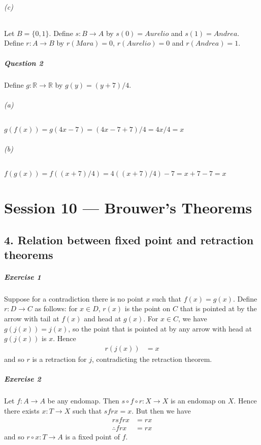 \documentclass{report}
\begin{document}
    \subparagraph{(c)}
    Let $B = \{ 0, 1 \}$. Define $s : B \rightarrow A$ by $s(0) = Aurelio$ and $s(1) = Andrea$.
    Define $r : A \rightarrow B$ by $r(Mara) = 0$, $r(Aurelio) = 0$ and $r(Andrea) = 1$.

    \paragraph{Question 2}
    Define $g : \mathbb{R} \rightarrow \mathbb{R}$ by $g(y) = (y+7)/4$.
    \subparagraph{(a)}
    $g(f(x)) = g(4x-7) = (4x-7+7)/4 = 4x/4 = x$
    \subparagraph{(b)}
    $f(g(x)) = f((x+7)/4) = 4((x+7)/4) - 7 = x+7-7 = x$

    \chapter{Session 10 --- Brouwer's Theorems}

    \section{4. Relation between fixed point and retraction theorems}

    \paragraph{Exercise 1}
    Suppose for a contradiction there is no point $x$ such that $f(x) = g(x)$. Define $r : D \rightarrow C$
    as follows: for $x \in D$, $r(x)$ is the point on $C$ that is pointed at by the arrow with tail at
    $f(x)$ and head at $g(x)$. For $x \in C$, we have $g(j(x)) = j(x)$, so the point that is pointed at by
    any arrow with head at $g(j(x))$ is $x$. Hence
    \begin{align*}
        r(j(x)) & = x
    \end{align*}
    and so $r$ is a retraction for $j$, contradicting the retraction theorem.

    \paragraph{Exercise 2}
    Let $f : A \rightarrow A$ be any endomap. Then $s \circ f \circ r : X \rightarrow X$ is an endomap on $X$.
    Hence there exists $x : T \rightarrow X$ such that $sfrx = x$. But then we have
    \begin{align*}
        rsfrx & = rx \\
        \therefore frx & = rx
    \end{align*}
    and so $r \circ x : T \rightarrow A$ is a fixed point of $f$.
\end{document}
